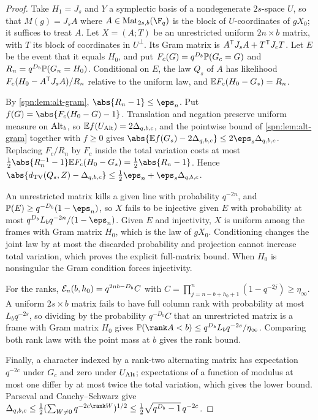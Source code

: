 \begin{proof}
Take $H_1=J_s$ and $Y$ a symplectic basis of a nondegenerate $2s$-space $U$, so that
$M(g)=J_sA$ where $A\in\spnMat_{2s,b}(\F_q)$ is the block of $U$-coordinates of $gX_0$; it
suffices to treat $A$. Let $X=(A;T)$ be an unrestricted uniform $2n\times b$ matrix, with
$T$ its block of coordinates in $U^\perp$. Its Gram matrix is $A^{\mathsf{T}}J_sA+T^{\mathsf{T}}J_cT$.
Let $E$ be the event that it equals $H_0$, and put $F_c(G)=q^{D_b}\mathbb{P}(G_c=G)$ and
$R_n=q^{D_b}\mathbb{P}(G_n=H_0)$. Conditional on $E$, the law $Q_s$ of $A$ has likelihood
$F_c(H_0-A^{\mathsf{T}}J_sA)/R_n$ relative to the uniform law, and $\mathbb{E} F_c(H_0-G_s)=R_n$.

By \cref{spn:lem:alt-gram}, $\abs{R_n-1}\le\eps_n$. Put $f(G)=\abs{F_c(H_0-G)-1}$. Translation
and negation preserve uniform measure on $\operatorname{Alt}_b$, so $\mathbb{E} f(U_{\operatorname{Alt}})=2\Delta_{q,b,c}$,
and the pointwise bound of \cref{spn:lem:alt-gram} together with $f\ge0$ gives
$\abs{\spnE f(G_s)-2\Delta_{q,b,c}}\le2\eps_s\Delta_{q,b,c}$. Replacing $F_c/R_n$ by $F_c$
inside the total variation costs at most
$\frac12\abs{R_n^{-1}-1}\spnE F_c(H_0-G_s)=\frac12\abs{R_n-1}$. Hence
$\abs{\spnTV(Q_s,Z)-\Delta_{q,b,c}}\le\frac12\eps_n+\eps_s\Delta_{q,b,c}$.

An unrestricted matrix kills a given line with probability $q^{-2n}$, and
$\spnP(E)\ge q^{-D_b}(1-\eps_n)$, so $X$ fails to be injective given $E$ with probability at
most $q^{D_b}L_bq^{-2n}/(1-\eps_n)$. Given $E$ and injectivity, $X$ is uniform among the frames
with Gram matrix $H_0$, which is the law of $gX_0$. Conditioning changes the joint law by at
most the discarded probability and projection cannot increase total variation, which proves the
explicit full-matrix bound. When $H_0$ is nonsingular the Gram condition forces injectivity.

For the ranks, $\mathcal{E}_n(b,h_0)=q^{2nb-D_b}C$ with
$C=\prod_{j=n-b+h_0+1}^{n}(1-q^{-2j})\ge\eta_\infty$. A uniform $2s\times b$ matrix fails to
have full column rank with probability at most $L_bq^{-2s}$, so dividing by the probability
$q^{-D_b}C$ that an unrestricted matrix is a frame with Gram matrix $H_0$ gives
$\spnP(\rank A<b)\le q^{D_b}L_bq^{-2s}/\eta_\infty$. Comparing both rank laws with the point
mass at $b$ gives the rank bound.

Finally, a character indexed by a rank-two alternating matrix has expectation $q^{-2c}$ under
$G_c$ and zero under $U_{\operatorname{Alt}}$; expectations of a function of modulus at most one differ by
at most twice the total variation, which gives the lower bound. Parseval and Cauchy--Schwarz give
$\Delta_{q,b,c}\le\frac12(\sum_{W\ne0}q^{-2c\rank W})^{1/2}\le\frac12\sqrt{q^{D_b}-1}\,q^{-2c}$.
\end{proof}

